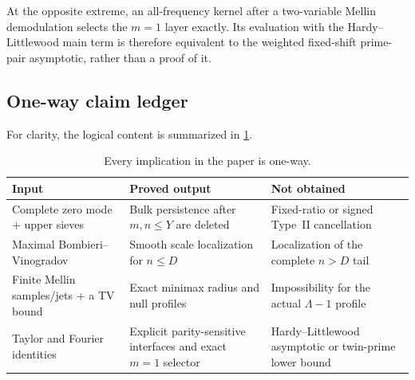At the opposite extreme, an all-frequency kernel after a two-variable
Mellin demodulation selects the $m=1$ layer exactly.  Its evaluation with
the Hardy--Littlewood main term is therefore equivalent to the weighted
fixed-shift prime-pair asymptotic, rather than a proof of it.

\subsection{One-way claim ledger}

For clarity, the logical content is summarized in
\cref{tab:intro-claim-ledger}.

\begin{table}[ht]
\centering
\small
\begin{tabular}{@{}
 >{\raggedright\arraybackslash}p{}
 >{\raggedright\arraybackslash}p{}
 >{\raggedright\arraybackslash}p{}@{}}
\toprule
Input & Proved output & Not obtained \\
\midrule
Complete zero mode + upper sieves
& Bulk persistence after $m,n\leq Y$ are deleted
& Fixed-ratio or signed Type~II cancellation \\
Maximal Bombieri--Vinogradov
& Smooth scale localization for $n\leq D$
& Localization of the complete $n>D$ tail \\
Finite Mellin samples/jets + a TV bound
& Exact minimax radius and null profiles
& Impossibility for the actual $\Lambda-1$ profile \\
Taylor and Fourier identities
& Explicit parity-sensitive interfaces and exact $m=1$ selector
& Hardy--Littlewood asymptotic or twin-prime lower bound \\
\bottomrule
\end{tabular}
\caption{Every implication in the paper is one-way.}
\label{tab:intro-claim-ledger}
\end{table}
